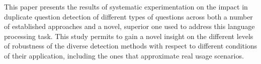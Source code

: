 This paper presents the results of systematic experimentation on the impact in duplicate question detection of different types of questions across both a number of established approaches and a novel, superior one used to address this language processing task. This study permits to gain a novel insight on the different levels of robustness of the diverse detection methods with respect to different conditions of their application, including the ones that approximate real usage scenarios.

